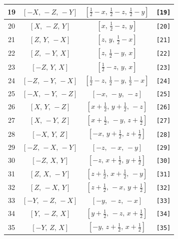 \documentclass[fleqn,8pt]{jsarticle}
\begin{document}
\begin{longtable}{cccc}
19 & $\left[ - X,\, - Z,\, - Y \right]$ & $\left[ \frac{1}{2} - x,\, \frac{1}{2} - z,\, \frac{1}{2} - y \right]$ & {\tt [19]} \\ \hline
20 & $\left[ X,\, - Z,\, Y \right]$ & $\left[ x,\, \frac{1}{2} - z,\, y \right]$ & {\tt [20]} \\ \hline
21 & $\left[ Z,\, Y,\, - X \right]$ & $\left[ z,\, y,\, \frac{1}{2} - x \right]$ & {\tt [21]} \\ \hline
22 & $\left[ Z,\, - Y,\, X \right]$ & $\left[ z,\, \frac{1}{2} - y,\, x \right]$ & {\tt [22]} \\ \hline
23 & $\left[ - Z,\, Y,\, X \right]$ & $\left[ \frac{1}{2} - z,\, y,\, x \right]$ & {\tt [23]} \\ \hline
24 & $\left[ - Z,\, - Y,\, - X \right]$ & $\left[ \frac{1}{2} - z,\, \frac{1}{2} - y,\, \frac{1}{2} - x \right]$ & {\tt [24]} \\ \hline
25 & $\left[ - X,\, - Y,\, - Z \right]$ & $\left[ - x,\, - y,\, - z \right]$ & {\tt [25]} \\ \hline
26 & $\left[ X,\, Y,\, - Z \right]$ & $\left[ x + \frac{1}{2},\, y + \frac{1}{2},\, - z \right]$ & {\tt [26]} \\ \hline
27 & $\left[ X,\, - Y,\, Z \right]$ & $\left[ x + \frac{1}{2},\, - y,\, z + \frac{1}{2} \right]$ & {\tt [27]} \\ \hline
28 & $\left[ - X,\, Y,\, Z \right]$ & $\left[ - x,\, y + \frac{1}{2},\, z + \frac{1}{2} \right]$ & {\tt [28]} \\ \hline
29 & $\left[ - Z,\, - X,\, - Y \right]$ & $\left[ - z,\, - x,\, - y \right]$ & {\tt [29]} \\ \hline
30 & $\left[ - Z,\, X,\, Y \right]$ & $\left[ - z,\, x + \frac{1}{2},\, y + \frac{1}{2} \right]$ & {\tt [30]} \\ \hline
31 & $\left[ Z,\, X,\, - Y \right]$ & $\left[ z + \frac{1}{2},\, x + \frac{1}{2},\, - y \right]$ & {\tt [31]} \\ \hline
32 & $\left[ Z,\, - X,\, Y \right]$ & $\left[ z + \frac{1}{2},\, - x,\, y + \frac{1}{2} \right]$ & {\tt [32]} \\ \hline
33 & $\left[ - Y,\, - Z,\, - X \right]$ & $\left[ - y,\, - z,\, - x \right]$ & {\tt [33]} \\ \hline
34 & $\left[ Y,\, - Z,\, X \right]$ & $\left[ y + \frac{1}{2},\, - z,\, x + \frac{1}{2} \right]$ & {\tt [34]} \\ \hline
35 & $\left[ - Y,\, Z,\, X \right]$ & $\left[ - y,\, z + \frac{1}{2},\, x + \frac{1}{2} \right]$ & {\tt [35]} \\ \hline

\end{longtable}
\end{document}
